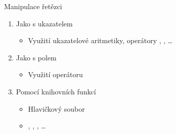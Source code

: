 \begin{frame}{Manipulace řetězci}

  \begin{enumerate}
    \item Jako s ukazatelem
    \begin{itemize}
      \item Využití ukazatelové aritmetiky, operátory \code{+}, \code{\-}, \dots
    \end{itemize}

    \pause

    \item Jako s polem
    \begin{itemize}
      \item Využití operátoru \code{[]}
    \end{itemize}

    \pause

    \item Pomocí knihovních funkcí
    \begin{itemize}
      \item Hlavičkový soubor 
      \item {}, , , \dots
    \end{itemize}

  \end{enumerate}

\end{frame}

